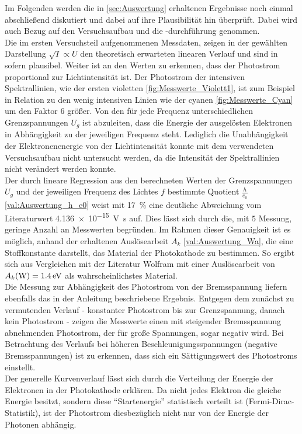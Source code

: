 Im Folgenden werden die in \cref{sec:Auswertung} erhaltenen Ergebnisse
noch einmal abschließend diskutiert und dabei auf ihre Plausibilität hin überprüft.
Dabei wird auch Bezug auf den Versuchsaufbau und die -durchführung genommen.\\

Die im ersten Versuchsteil aufgenommenen Messdaten, zeigen in der 
gewählten Darstellung $\sqrt{I} \propto U$ den theoretisch erwarteten 
linearen Verlauf und sind in sofern plausibel. Weiter ist
an den Werten zu erkennen, dass der Photostrom proportional zur Lichtintensität ist.
Der Photostrom der intensiven Spektrallinien, wie der ersten violetten
\cref{fig:Messwerte_Violett1}, ist zum Beispiel in Relation zu den wenig intensiven 
Linien wie der cyanen \cref{fig:Messwerte_Cyan} um den Faktor $6$ größer.
Von den für jede Frequenz unterschiedlichen Grenzspannungen $U_{g}$ ist 
abzuleiten, dass die Energie der ausgelösten Elektronen in Abhängigkeit zu der 
jeweiligen Frequenz steht. Lediglich die Unabhängigkeit der Elektronenenergie von der 
Lichtintensität konnte mit dem verwendeten Versuchsaufbau nicht untersucht werden,
da die Intensität der Spektrallinien nicht verändert werden konnte.\\

Der durch lineare Regression aus den berechneten Werten der Grenzspannungen 
$U_{g}$ und der jeweiligen Frequenz des Lichtes $f$ bestimmte Quotient
$\tfrac{h}{e_{0}}$ \cref{val:Auswertung_h_e0} weist mit \SI{17}{\percent} eine
deutliche Abweichung vom Literaturwert \SI{4.136e-15}{\volt\second}\cite{SciPy} auf.
Dies lässt sich durch die, mit $5$ Messung, geringe Anzahl an Messwerten
begründen.
Im Rahmen dieser Genauigkeit ist es möglich, anhand der erhaltenen Auslösearbeit
$A_{k}$ \cref{val:Auswertung_Wa}, die eine Stoffkonstante darstellt, das Material 
der Photokathode zu bestimmen. So ergibt sich aus Vergleichen mit der Literatur 
\cite{Mende09} Wolfram mit einer Auslösearbeit von $A_{k}(\ce{W}) = \SI{1.4}{\eV}$
als wahrscheinlichstes Material.\\

Die Messung zur Abhängigkeit des Photostrom von der Bremsspannung liefern
ebenfalls das in der Anleitung \cite{V500} beschriebene Ergebnis.
Entgegen dem zunächst zu vermutenden Verlauf - konstanter Photostrom bis zur
Grenzspannung, danach kein Photostrom - zeigen die Messwerte einen mit steigender 
Bremsspannung abnehmenden Photostrom, der für große Spannungen, sogar negativ
wird. Bei Betrachtung des Verlaufs bei höheren Beschleunigungsspannungen 
(negative Bremsspannungen) ist zu erkennen, dass sich ein Sättigungswert 
des Photostroms einstellt. \\
Der generelle Kurvenverlauf lässt sich durch die Verteilung der 
Energie der Elektronen in der Photokathode erklären. Da nicht jedes 
Elektron die gleiche Energie besitzt, sondern diese \enquote{Startenergie}
statistisch verteilt ist (Fermi-Dirac-Statistik), ist der Photostrom diesbezüglich 
nicht nur von der Energie der Photonen abhängig. 

